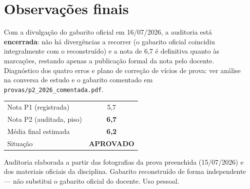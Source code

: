 \documentclass[12pt, a4paper]{article}
\begin{document}
\section{Observações finais}

\begin{provabox}[title={Encerramento}]
Com a divulgação do gabarito oficial em 16/07/2026, a auditoria está
\textbf{encerrada}: não há divergências a recorrer (o gabarito oficial
coincidiu integralmente com o reconstruído) e a nota de 6{,}7 é definitiva
quanto às marcações, restando apenas a publicação formal da nota pelo
docente. Diagnóstico dos quatro erros e plano de correção de vícios de prova:
ver análise na conversa de estudo e o gabarito comentado em
\texttt{provas/p2\_2026\_comentada.pdf}.
\end{provabox}

\begin{center}
\begin{tabular}{lc}
\toprule
Nota P1 (registrada) & 5{,}7 \\
Nota P2 (auditada, piso) & \textbf{6{,}7} \\
Média final estimada & \textbf{6{,}2} \\
Situação & \textbf{APROVADO} \\
\bottomrule
\end{tabular}
\end{center}

\vfill
{\small\color{grayrbc} Auditoria elaborada a partir das fotografias da prova
preenchida (15/07/2026) e dos materiais oficiais da disciplina. Gabarito
reconstruído de forma independente --- não substitui o gabarito oficial do
docente. Uso pessoal.}
\end{document}
